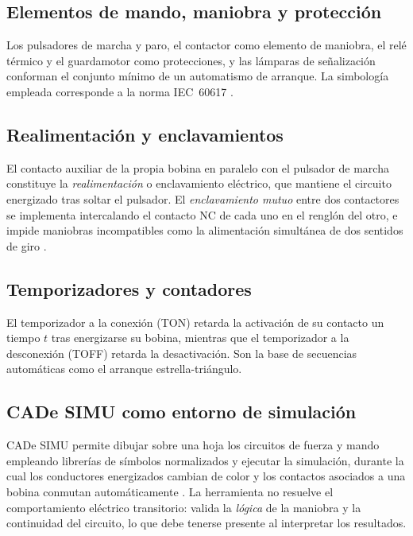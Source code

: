\documentclass[conference,a4paper,10pt]{IEEEtran}
\begin{document}
\subsection{Elementos de mando, maniobra y protección}
Los pulsadores de marcha y paro, el contactor como elemento de maniobra, el
relé térmico y el guardamotor como protecciones, y las lámparas de
señalización conforman el conjunto mínimo de un automatismo de arranque. La
simbología empleada corresponde a la norma IEC~60617 \cite{iec60617}.

\subsection{Realimentación y enclavamientos}
El contacto auxiliar de la propia bobina en paralelo con el pulsador de marcha
constituye la \textit{realimentación} o enclavamiento eléctrico, que mantiene
el circuito energizado tras soltar el pulsador. El \textit{enclavamiento
mutuo} entre dos contactores se implementa intercalando el contacto NC de cada
uno en el renglón del otro, e impide maniobras incompatibles como la
alimentación simultánea de dos sentidos de giro \cite{roldan}.

\subsection{Temporizadores y contadores}
El temporizador a la conexión (TON) retarda la activación de su contacto un
tiempo $t$ tras energizarse su bobina, mientras que el temporizador a la
desconexión (TOFF) retarda la desactivación. Son la base de secuencias
automáticas como el arranque estrella-triángulo.

\subsection{CADe SIMU como entorno de simulación}
CADe SIMU permite dibujar sobre una hoja los circuitos de fuerza y mando
empleando librerías de símbolos normalizados y ejecutar la simulación, durante
la cual los conductores energizados cambian de color y los contactos asociados
a una bobina conmutan automáticamente \cite{cadesimu}. La herramienta no
resuelve el comportamiento eléctrico transitorio: valida la \textit{lógica} de
la maniobra y la continuidad del circuito, lo que debe tenerse presente al
interpretar los resultados.
\end{document}
